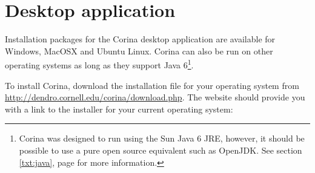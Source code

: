 \section{Desktop application}
\label{txt:desktopinstall}
Installation packages for the Corina desktop application are available for Windows, MacOSX and Ubuntu Linux.  Corina can also be run on other operating systems as long as they support Java 6\footnote{Corina was designed to run using the Sun Java 6 JRE, however, it should be possible to use a pure open source equivalent such as OpenJDK.  See section \ref{txt:java}, page \pageref{txt:java} for more information.}.

To install Corina, download the installation file for your operating system from \url{http://dendro.cornell.edu/corina/download.php}. The website should provide you with a link to the installer for your current operating system:

